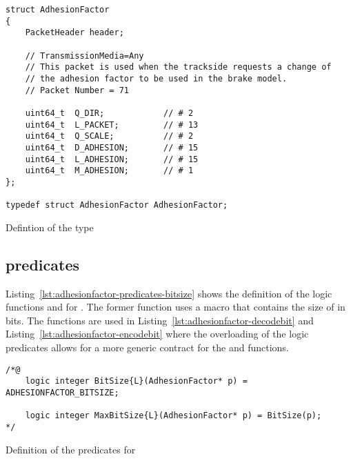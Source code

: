 \begin{listing}[hbt]
\begin{minipage}{0.99\textwidth}
\begin{lstlisting}[style=acsl-block]
struct AdhesionFactor
{
    PacketHeader header;

    // TransmissionMedia=Any
    // This packet is used when the trackside requests a change of
    // the adhesion factor to be used in the brake model.
    // Packet Number = 71

    uint64_t  Q_DIR;            // # 2
    uint64_t  L_PACKET;         // # 13
    uint64_t  Q_SCALE;          // # 2
    uint64_t  D_ADHESION;       // # 15
    uint64_t  L_ADHESION;       // # 15
    uint64_t  M_ADHESION;       // # 1
};

typedef struct AdhesionFactor AdhesionFactor;
\end{lstlisting}
\end{minipage}
\caption{\label{lst:adhesionfactor-type}Defintion of the type }
\end{listing}

\FloatBarrier  %

\subsection{\acsl predicates }
\label{sec:adhesionfactor-predicates-bitsize}

Listing~\ref{lst:adhesionfactor-predicates-bitsize} shows the definition of
the logic functions  and  for .
The former function uses a macro that contains the size of  in bits.
The functions are used in Listing~\ref{lst:adhesionfactor-decodebit} and
Listing~\ref{lst:adhesionfactor-encodebit} where the overloading of the
logic predicates allows for a more generic \acsl contract for the  and
 functions.

\begin{listing}[hbt]
\begin{minipage}{0.99\textwidth}
\begin{lstlisting}[style=acsl-block]
/*@
    logic integer BitSize{L}(AdhesionFactor* p) = ADHESIONFACTOR_BITSIZE;

    logic integer MaxBitSize{L}(AdhesionFactor* p) = BitSize(p);
*/
\end{lstlisting}
\end{minipage}
\caption{\label{lst:adhesionfactor-predicates-bitsize}Definition of the  predicates for }
\end{listing}

